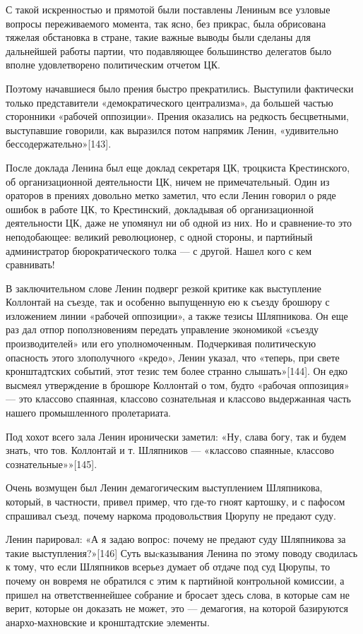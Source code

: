 \documentclass[12pt, a4paper, openany]{book}
\begin{document}
С такой искренностью и прямотой были поставлены Лениным все узловые вопросы переживаемого момента, так ясно, без прикрас, была обрисована тяжелая обстановка в стране, такие важные выводы были сделаны для дальнейшей работы партии, что подавляющее большинство делегатов было вполне удовлетворено политическим отчетом ЦК.

Поэтому начавшиеся было прения быстро прекратились. Выступили фактически только представители «демократического централизма», да большей частью сторонники «рабочей оппозиции». Прения оказались на редкость бесцветными, выступавшие говорили, как выразился потом напрямик Ленин, «удивительно бессодержательно»[143].

После доклада Ленина был еще доклад секретаря ЦК, троцкиста Крестинского, об организационной деятельности ЦК, ничем не примечательный. Один из ораторов в прениях довольно метко заметил, что если Ленин говорил о ряде ошибок в работе ЦК, то Крестинский, докладывая об организационной деятельности ЦК, даже не упомянул ни об одной из них. Но и сравнение-то это неподобающее: великий революционер, с одной стороны, и партийный администратор бюрократического толка — с другой. Нашел кого с кем сравнивать!

В заключительном слове Ленин подверг резкой критике как выступление Коллонтай на съезде, так и особенно выпущенную ею к съезду брошюру с изложением линии «рабочей оппозиции», а также тезисы Шляпникова. Он еще раз дал отпор поползновениям передать управление экономикой «съезду производителей» или его уполномоченным. Подчеркивая политическую опасность этого злополучного «кредо», Ленин указал, что «теперь, при свете кронштадтских событий, этот тезис тем более странно слышать»[144]. Он едко высмеял утверждение в брошюре Коллонтай о том, будто «рабочая оппозиция» — это классово спаянная, классово сознательная и классово выдержанная часть нашего промышленного пролетариата.

Под хохот всего зала Ленин иронически заметил: «Ну, слава богу, так и будем знать, что тов. Коллонтай и т. Шляпников — «классово спаянные, классово сознательные»»[145].

Очень возмущен был Ленин демагогическим выступлением Шляпникова, который, в частности, привел пример, что где-то гноят картошку, и с пафосом спрашивал съезд, почему наркома продовольствия Цюрупу не предают суду.

Ленин парировал: «А я задаю вопрос: почему не предают суду Шляпникова за такие выступления?»[146] Суть выcказывания Ленина по этому поводу сводилась к тому, что если Шляпников всерьез думает об отдаче под суд Цюрупы, то почему он вовремя не обратился с этим к партийной контрольной комиссии, а пришел на ответственнейшее собрание и бросает здесь слова, в которые сам не верит, которые он доказать не может, это — демагогия, на которой базируются анархо-махновские и кронштадтские элементы.
\end{document}
